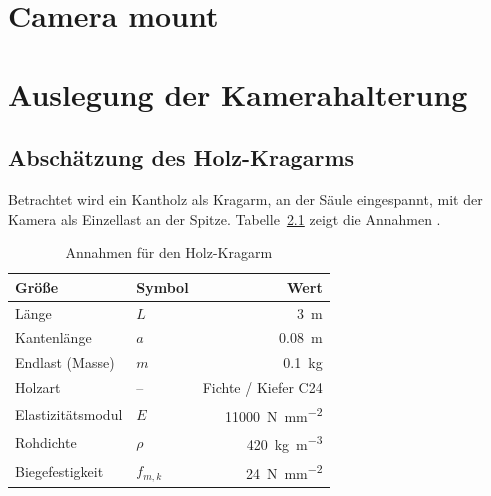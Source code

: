 \cleardoublepage
\ifdocenglish
    \chapter{Camera mount}
\else
    \chapter{Auslegung der Kamerahalterung}
\fi
\label{app:Mechanik}

\section{Abschätzung des Holz-Kragarms}
\label{app:mech-holz}
Betrachtet wird ein Kantholz als Kragarm, an der Säule eingespannt, mit der Kamera als Einzellast an der Spitze. Tabelle~\ref{tab:mech-holz} zeigt die Annahmen .

\begin{table}[H]
    \centering
    \caption{Annahmen für den Holz-Kragarm}
    \label{tab:mech-holz}
    \begin{tabular}{llr}
        \toprule
        \textbf{Größe} & \textbf{Symbol} & \textbf{Wert} \\
        \midrule
        Länge             & $L$       & \SI{3}{\metre} \\
        Kantenlänge       & $a$       & \SI{0,08}{\metre} \\
        Endlast (Masse)   & $m$       & \SI{0,1}{\kilo\gram} \\
        Holzart           & --        & Fichte / Kiefer C24 \\
        Elastizitätsmodul & $E$       & \SI[per-mode=symbol]{11000}{\newton\per\square\milli\metre} \\
        Rohdichte         & $\rho$    & \SI[per-mode=symbol]{420}{\kilo\gram\per\cubic\metre} \\
        Biegefestigkeit   & $f_{m,k}$ & \SI[per-mode=symbol]{24}{\newton\per\square\milli\metre} \\
        \bottomrule
    \end{tabular}
\end{table}

